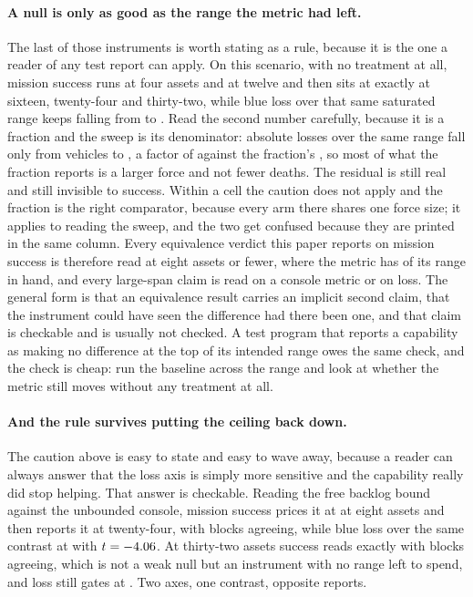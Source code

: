 \documentclass[11pt]{article}
\begin{document}
\paragraph{A null is only as good as the range the metric had left.} The last of those instruments is worth stating as a rule, because it is the one a reader of any test report can apply. On this scenario, with no treatment at all, mission success runs \CeSuccFour{} at four assets and \CeSuccTwelve{} at twelve and then sits at exactly \CeSuccSixteen{} at sixteen, twenty-four and thirty-two, while blue loss over that same saturated range keeps falling from \CeLossSixteen{} to \CeLossThirtyTwo{}. Read the second number carefully, because it is a fraction and the sweep is its denominator: absolute losses over the same range fall only from \CeDeadSixteen{} vehicles to \CeDeadThirtyTwo{}, a factor of \CeDeadRatio{} against the fraction's \CeLossRatio{}, so most of what the fraction reports is a larger force and not fewer deaths. The residual is still real and still invisible to success. Within a cell the caution does not apply and the fraction is the right comparator, because every arm there shares one force size; it applies to reading the sweep, and the two get confused because they are printed in the same column. Every equivalence verdict this paper reports on mission success is therefore read at eight assets or fewer, where the metric has \CeSuccEight{} of its range in hand, and every large-span claim is read on a console metric or on loss. The general form is that an equivalence result carries an implicit second claim, that the instrument could have seen the difference had there been one, and that claim is checkable and is usually not checked. A test program that reports a capability as making no difference at the top of its intended range owes the same check, and the check is cheap: run the baseline across the range and look at whether the metric still moves without any treatment at all.

\paragraph{And the rule survives putting the ceiling back down.} The caution above is easy to state and easy to wave away, because a reader can always answer that the loss axis is simply more sensitive and the capability really did stop helping. That answer is checkable. Reading the free backlog bound against the unbounded console, mission success prices it at \LsSuccEight{} at eight assets and then reports it \LsSuccTwentyFourV{} at twenty-four, \LsSuccTwentyFour{} with \LsSuccTwentyFourBlocks{} blocks agreeing, while blue loss over the same contrast \LsLossTwentyFourV{} at \LsLossTwentyFour{} with $t = -4.06{}$. At thirty-two assets success reads exactly \LsDeadEff{} with \LsDeadBlocks{} blocks agreeing, which is not a weak null but an instrument with no range left to spend, and loss still gates at \LsAliveEff{}. Two axes, one contrast, opposite reports.
\end{document}
